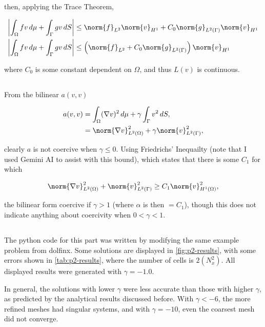 \documentclass{hw-template}
\newcommand{\intOm}{\int_{\Omega}}
\newcommand{\hOne}{{H^1}}
\newcommand{\ltwo}{{L^2}}
\begin{document}
then, applying the Trace Theorem,

\begin{align}
    \left|\intOm fv\, d\mu + \int_{\Gamma} gv \, dS\right| &\leq  \norm{f}_\ltwo \norm{v}_\hOne + C_0\norm{g}_{L^2(\Gamma)}\norm{v}_\hOne\\
    \left|\intOm fv\, d\mu + \int_{\Gamma} gv \, dS\right| &\leq \left(\norm{f}_\ltwo +  C_0\norm{g}_{L^2(\Gamma)}\right)\norm{v}_\hOne
\end{align}

where $C_0$ is some constant dependent on $\Omega$, and thus $L(v)$ is continuous.

\subsection{}

From the bilinear $a(v,v)$

\begin{align}
    a(v, v) &= \intOm (\nabla v)^2\, d\mu + \gamma \int_\Gamma v^2 \, dS,\\
            &= \norm{\nabla v}_{\ltwo(\Omega)}^2 + \gamma \norm{v}_{L^2(\Gamma)}^2,
\end{align}

clearly $a$ is not coercive when $\gamma \leq 0$. Using Friedrichs' Inequailty (note that I used Gemini AI to assist with this bound), which states that there is some $C_1$ for which

\begin{equation}
    \norm{\nabla v}_{\ltwo(\Omega)}^2 + \norm{v}_{\ltwo(\Gamma)}^2 \geq C_1 \norm{v}_{\hOne(\Omega)}^2,
\end{equation}

the bilinear form  coercive if $\gamma > 1$ (where $\alpha$ is then $=C_1$), though this does not indicate anything about coercivity when $0 < \gamma < 1$.

\subsection{}

The python code for this part was written by modifying the same example problem from dolfinx. Some solutions are displayed in \autoref{fig:p2-results}, with some errors shown in \autoref{tab:p2-results}, where the number of cells is $2(N_x^2)$. All displayed results were generated with $\gamma=-1.0$.

In general, the solutions with lower $\gamma$ were less accurate than those with higher $\gamma$, as predicted by the analytical results discussed before. With $\gamma < -6$, the more refined meshes had singular systems, and with $\gamma = -10$, even the coarsest mesh did not converge.
\end{document}
